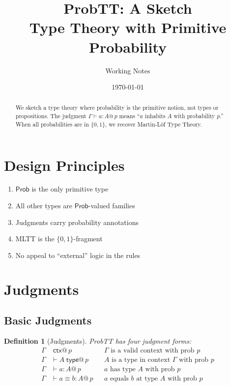 \documentclass[11pt,a4paper]{article}
\title{ProbTT: A Sketch\\[0.5em]
\large Type Theory with Primitive Probability}
\author{Working Notes}
\date{\today}
\makeatletter
\newtheorem{definition}{Definition}[section]
\newcommand{\ctx}{\;\mathsf{ctx}}
\newcommand{\type}{\;\mathsf{type}}
\newcommand{\Prob}{\mathsf{Prob}}
\newcommand{\pmark}[1]{@\, #1}  %
\makeatother
\begin{document}
\maketitle

\begin{abstract}
We sketch a type theory where probability is the primitive notion, not types or propositions. The judgment $\Gamma \vdash a : A \pmark{p}$ means ``$a$ inhabits $A$ with probability $p$.'' When all probabilities are in $\{0,1\}$, we recover Martin-L\"of Type Theory.
\end{abstract}

\section{Design Principles}

\begin{enumerate}
    \item $\Prob$ is the only primitive type
    \item All other types are $\Prob$-valued families
    \item Judgments carry probability annotations
    \item MLTT is the $\{0,1\}$-fragment
    \item No appeal to ``external'' logic in the rules
\end{enumerate}

\section{Judgments}

\subsection{Basic Judgments}

\begin{definition}[Judgments]
ProbTT has four judgment forms:
\begin{align}
\Gamma &\ctx \pmark{p} && \text{$\Gamma$ is a valid context with prob $p$} \\
\Gamma &\vdash A \type \pmark{p} && \text{$A$ is a type in context $\Gamma$ with prob $p$} \\
\Gamma &\vdash a : A \pmark{p} && \text{$a$ has type $A$ with prob $p$} \\
\Gamma &\vdash a \equiv b : A \pmark{p} && \text{$a$ equals $b$ at type $A$ with prob $p$}
\end{align}
\end{definition}
\end{document}
